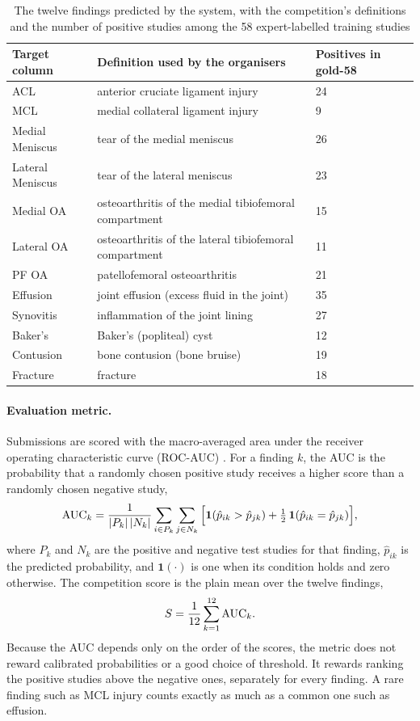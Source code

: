 \begin{table}[htbp]
\centering\footnotesize{}
\caption[The twelve findings and their gold-58 positives]{The twelve findings predicted by the system, with the competition's definitions and the number of positive studies among the 58 expert-labelled training studies}
\label{tab:targets}
\begin{tabular}{L{3.2cm}L{8.4cm}C{2.2cm}}
\toprule
Target column & Definition used by the organisers & Positives in gold-58 \\
\midrule
ACL & anterior cruciate ligament injury & 24 \\
MCL & medial collateral ligament injury & 9 \\
Medial Meniscus & tear of the medial meniscus & 26 \\
Lateral Meniscus & tear of the lateral meniscus & 23 \\
Medial OA & osteoarthritis of the medial tibiofemoral compartment & 15 \\
Lateral OA & osteoarthritis of the lateral tibiofemoral compartment & 11 \\
PF OA & patellofemoral osteoarthritis & 21 \\
Effusion & joint effusion (excess fluid in the joint) & 35 \\
Synovitis & inflammation of the joint lining & 27 \\
Baker's & Baker's (popliteal) cyst & 12 \\
Contusion & bone contusion (bone bruise) & 19 \\
Fracture & fracture & 18 \\
\bottomrule
\end{tabular}
\end{table}

\paragraph{Evaluation metric.} Submissions are scored with the macro-averaged area under the receiver operating characteristic curve (ROC-AUC) \cite{hanley1982,fawcett2006}. For a finding $k$, the AUC is the probability that a randomly chosen positive study receives a higher score than a randomly chosen negative study,
\begin{equation}
\mbox{AUC}_k=\frac{1}{|P_k|\,|N_k|}\sum_{i\in P_k}\sum_{j\in N_k}\Big[\mathbf{1}(\hat p_{ik}>\hat p_{jk})+\tfrac12\,\mathbf{1}(\hat p_{ik}=\hat p_{jk})\Big],
\label{eq:auc}
\end{equation}
where $P_k$ and $N_k$ are the positive and negative test studies for that finding, $\hat p_{ik}$ is the predicted probability, and $\mathbf{1}(\cdot)$ is one when its condition holds and zero otherwise. The competition score is the plain mean over the twelve findings,
\begin{equation}
S=\frac{1}{12}\sum_{k=1}^{12}\mbox{AUC}_k .
\label{eq:macroauc}
\end{equation}
Because the AUC depends only on the order of the scores, the metric does not reward calibrated probabilities or a good choice of threshold. It rewards ranking the positive studies above the negative ones, separately for every finding. A rare finding such as MCL injury counts exactly as much as a common one such as effusion.


